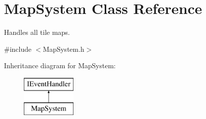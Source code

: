 \hypertarget{class_map_system}{}\section{Map\+System Class Reference}
\label{class_map_system}


Handles all tile maps.  




{\ttfamily \#include $<$Map\+System.\+h$>$}

Inheritance diagram for Map\+System\+:\begin{figure}[H]
\begin{center}
\leavevmode
\includegraphics[height=2.000000cm]{class_map_system}
\end{center}
\end{figure}
